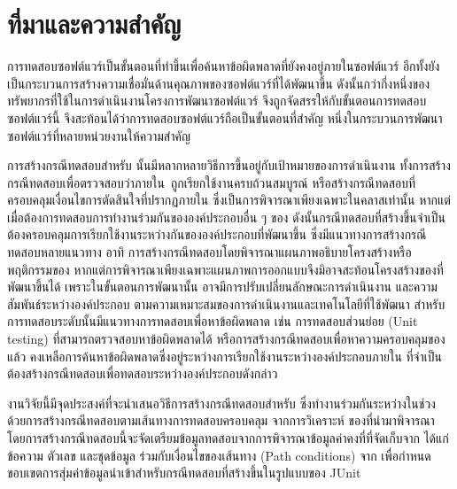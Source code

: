 \section{ที่มาและความสำคัญ} 
\label{sec:introduction}

การทดสอบซอฟต์แวร์เป็นขั้นตอนที่ทำขึ้นเพื่อค้นหาข้อผิดพลาดที่ยังคงอยู่ภายในซอฟต์แวร์ \cite{Myers:2011:AST:983238} 
อีกทั้งยังเป็นกระบวนการสร้างความเชื่อมั่นด้านคุณภาพของซอฟต์แวร์ที่ได้พัฒนาขึ้น ดังนั้นกว่ากึ่งหนึ่งของทรัพยากรที่ใช้ในการดำเนินงานโครงการพัฒนาซอฟต์แวร์
จึงถูกจัดสรรให้กับขั้นตอนการทดสอบซอฟต์แวร์นี้ \cite{Jackson2007, Tassey2002} จึงสะท้อนได้ว่าการทดสอบซอฟต์แวร์ถือเป็นขั้นตอนที่สำคัญ
หนึ่งในกระบวนการพัฒนาซอฟต์แวร์ที่หลายหน่วยงานให้ความสำคัญ

การสร้างกรณีทดสอบสำหรับ\FirstTimeDefine{\SUT}{\SUTEN} นั้นมีหลากหลายวิธีการขึ้นอยู่กับเป้าหมายของการดำเนินงาน 
ทั้งการสร้างกรณีทดสอบเพื่อตรวจสอบว่า{\method}ภายใน\FirstTimeDefine{\CUT}{\CUTEN}\ ถูกเรียกใช้งานครบถ้วนสมบูรณ์ \cite{6847360}
หรือสร้างกรณีทดสอบที่ครอบคลุมเงื่อนไขการตัดสินใจที่ปรากฏภายใน{\CUT} \cite{Luanghirun2016} ซึ่งเป็นการพิจารณาเพียงเฉพาะในคลาสเท่านั้น
หากแต่เมื่อต้องการทดสอบการทำงานร่วมกันขององค์ประกอบอื่น ๆ ของ\FirstTimeDefine{\SUT}{\SUTEN} 
ดังนั้นกรณีทดสอบที่สร้างขึ้นจำเป็นต้องครอบคลุมการเรียกใช้งานระหว่างกันขององค์ประกอบที่พัฒนาขึ้น
ซึ่งมีแนวทางการสร้างกรณีทดสอบหลายแนวทาง อาทิ 
การสร้างกรณีทดสอบโดยพิจารณาแผนภาพอธิบายโครงสร้างหรือพฤติกรรมของ{\softwareComponent} \cite{Panthi2012, Shirole2013}
หากแต่การพิจารณาเพียงเฉพาะแผนภาพการออกแบบจึงมิอาจสะท้อนโครงสร้างของ{\sourcecode}ที่พัฒนาขึ้นได้ 
เพราะในขั้นตอนการพัฒนานั้น อาจมีการปรับเปลี่ยนลักษณะการดำเนินงาน และความสัมพันธ์ระหว่างองค์ประกอบ 
ตามความเหมาะสมของการดำเนินงานและเทคโนโลยีที่ใช้พัฒนา 
สำหรับการทดสอบระดับ{\class}นั้นมีแนวทางการทดสอบเพื่อหาข้อผิดพลาด เช่น การทดสอบส่วนย่อย (Unit testing) ที่สามารถตรวจสอบหาข้อผิดพลาดได้
หรือการสร้างกรณีทดสอบเพื่อหาความครอบคลุมของ{\sourcecode} \cite{6847360, Luanghirun2016} แล้ว
คงเหลือการค้นหาข้อผิดพลาดซึ่งอยู่ระหว่างการเรียกใช้งานระหว่างองค์ประกอบภายใน{\sourcecode} 
ที่จำเป็นต้องสร้างกรณีทดสอบเพื่อทดสอบ{\Path}ระหว่างองค์ประกอบดังกล่าว

งานวิจัยนี้มีจุดประสงค์ที่จะนำเสนอวิธีการสร้างกรณีทดสอบสำหรับ{\sourcecode}
ซึ่งทำงานร่วมกันระหว่างในช่วง\FirstTimeDefine{\IntegrationTesting}{\IntegrationTestingEN} 
ด้วยการสร้างกรณีทดสอบตามเส้นทางการทดสอบครอบคลุม\FirstTimeDefine{\scg}{\scgEN} 
จากการวิเคราะห์\FirstTimeDefine{\StaticInformation}{\StaticInformationEN} 
ของ{\sourcecode}ที่นำมาพิจารณา โดยการสร้างกรณีทดสอบนี้จะจัดเตรียมข้อมูลทดสอบจากการพิจารณาข้อมูลค่าคงที่ที่จัดเก็บจาก{\sourcecode} 
ได้แก่ ข้อความ ตัวเลข และชุดข้อมูล ร่วมกับเงื่อนไขของเส้นทาง (Path conditions) จาก{\cfg} 
เพื่อกำหนดขอบเขตการสุ่มค่าข้อมูลนำเข้าสำหรับกรณีทดสอบที่สร้างขึ้นในรูปแบบของ JUnit
